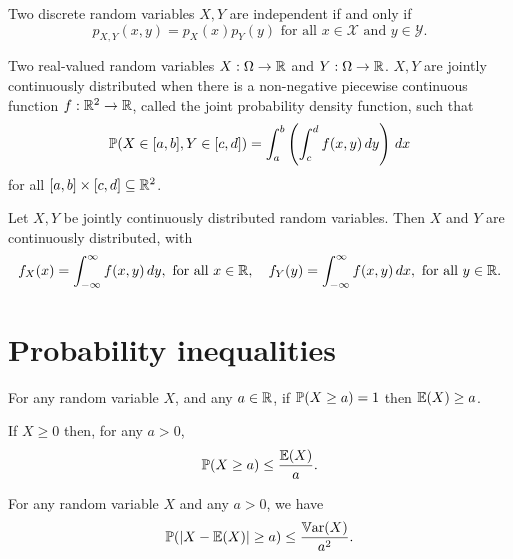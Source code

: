 \documentclass[10pt, a4paper]{article}
\begin{document}
\begin{lemma}
    Two discrete random variables $X, Y$ are independent if and only if
    \[
    p_{X, Y}(x, y) = p_X(x)p_Y(y)\text{ for all $x \in \mathcal{X}$ and $y \in \mathcal{Y}$.}
    \]
\end{lemma}

\begin{definition}
    Two real-valued random variables $X : \Omega \to \R$ and $Y : \Omega \to \R$.
    $X, Y$ are jointly continuously distributed when there is a non-negative piecewise continuous function $f : \R ^ 2 \to \R$,
    called the joint probability density function,
    such that
    \[
    \P(X \in [a, b], Y \in [c, d]) = \int_{a}^{b}\left(\int_{c}^{d}f(x, y)\,dy\right)\,dx
    \]
    for all $[a, b] \times [c, d] \subseteq \R ^ 2$.
\end{definition}

\begin{corollary}
    Let $X, Y$ be jointly continuously distributed random variables.
    Then $X$ and $Y$ are continuously distributed,
    with
    \[
    f_X(x) = \int_{-\infty}^{\infty}f(x, y)\,dy,\text{ for all $x \in \R$},\quad f_Y(y) = \int_{-\infty}^{\infty}f(x, y)\,dx,\text{ for all $y \in \R$}.
    \]
\end{corollary}

\newpage

\section{Probability inequalities}

\begin{theorem}
    For any random variable $X$,
    and any $a \in \R$,
    if $\P(X \geq a) = 1$ then $\E(X) \geq a$.
\end{theorem}

\begin{theorem}
    If $X \geq 0$ then,
    for any $a > 0$,
    \[
    \P(X \geq a) \leq \frac{\E(X)}{a}.
    \]
\end{theorem}

\begin{corollary}
    For any random variable $X$ and any $a > 0$,
    we have
    \[
    \P(|X - \E(X)| \geq a) \leq \frac{\Var(X)}{a ^ 2}.
    \]
\end{corollary}
\end{document}

